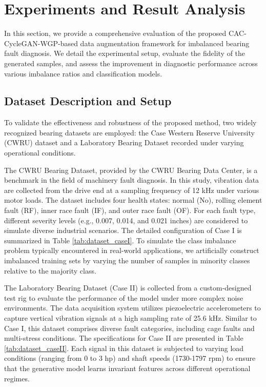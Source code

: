 \section{Experiments and Result Analysis}
In this section, we provide a comprehensive evaluation of the proposed CAC-CycleGAN-WGP-based data augmentation framework for imbalanced bearing fault diagnosis. We detail the experimental setup, evaluate the fidelity of the generated samples, and assess the improvement in diagnostic performance across various imbalance ratios and classification models.

\subsection{Dataset Description and Setup}
To validate the effectiveness and robustness of the proposed method, two widely recognized bearing datasets are employed: the Case Western Reserve University (CWRU) dataset \cite{Smith2015} and a Laboratory Bearing Dataset recorded under varying operational conditions.

The CWRU Bearing Dataset, provided by the CWRU Bearing Data Center, is a benchmark in the field of machinery fault diagnosis. In this study, vibration data are collected from the drive end at a sampling frequency of 12 kHz under various motor loads. The dataset includes four health states: normal (No), rolling element fault (RF), inner race fault (IF), and outer race fault (OF). For each fault type, different severity levels (e.g., 0.007, 0.014, and 0.021 inches) are considered to simulate diverse industrial scenarios. The detailed configuration of Case I is summarized in Table \ref{tab:dataset_caseI}. To simulate the class imbalance problem typically encountered in real-world applications, we artificially construct imbalanced training sets by varying the number of samples in minority classes relative to the majority class.

The Laboratory Bearing Dataset (Case II) is collected from a custom-designed test rig to evaluate the performance of the model under more complex noise environments. The data acquisition system utilizes piezoelectric accelerometers to capture vertical vibration signals at a high sampling rate of 25.6 kHz. Similar to Case I, this dataset comprises diverse fault categories, including cage faults and multi-stress conditions. The specifications for Case II are presented in Table \ref{tab:dataset_caseII}. Each signal in this dataset is subjected to varying load conditions (ranging from 0 to 3 hp) and shaft speeds (1730-1797 rpm) to ensure that the generative model learns invariant features across different operational regimes.

